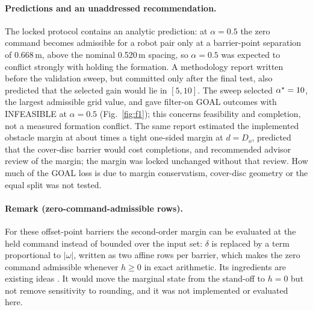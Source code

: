 \documentclass[journal]{IEEEtran}
\begin{document}
\paragraph{Predictions and an unaddressed recommendation.} The locked protocol contains an analytic
prediction: at $\alpha=0.5$ the zero command becomes admissible for a robot pair only at a barrier-point
separation of 0.668\,m, above the nominal 0.520\,m spacing, so $\alpha=0.5$ was expected to conflict
strongly with holding the formation. A methodology report written before the validation sweep, but
committed only after the final test, also predicted that the
selected gain would lie in $[5,10]$. The sweep selected $\alpha^\star=10$, the largest admissible
grid value, and gave \SelGoalhalf{} filter-on GOAL outcomes with \SelInfhalf{} INFEASIBLE at
$\alpha=0.5$ (Fig.~\ref{fig:f1}); this concerns feasibility and completion, not a measured formation
conflict. The same report estimated the implemented obstacle margin at about \MarginRatioObst{} times a
tight one-sided margin at $d=D_o$, predicted that the cover-disc barrier would cost completions, and
recommended advisor review of the margin; the margin was locked unchanged without that review. How much
of the GOAL loss is due to margin conservatism, cover-disc geometry or the equal split was not tested.

\paragraph{Remark (zero-command-admissible rows).} For these offset-point barriers the second-order
margin can be evaluated at the held command instead of bounded over the input set: $\delta$ is replaced
by a term proportional to $|\omega|$, written as two affine rows per barrier, which makes the zero
command admissible whenever $h\ge0$ in exact arithmetic. Its ingredients
are existing ideas \cite{breeden2022,vandenberg2011,chen2021}. It would move the marginal state from the
stand-off to $h=0$ but not remove sensitivity to rounding, and it was not implemented or evaluated here.
\end{document}
